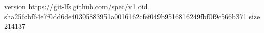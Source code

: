 version https://git-lfs.github.com/spec/v1
oid sha256:bf64e7f0dd6de40305883951a0016162cfef049b9516816249fbf0f9c566b371
size 214137
